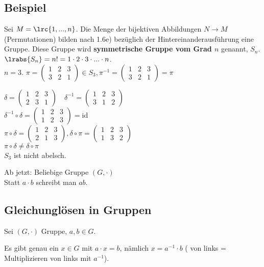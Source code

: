 	\subsection{Beispiel}
	
	Sei $M=\lrc{1,...,n}$. Die Menge der bijektiven Abbildungen $N\rightarrow M$ (Permutationen) bilden nach 1.6e) bezüglich der Hintereinanderausführung eine Gruppe. Diese Gruppe wird \textbf{symmetrische Gruppe vom Grad $n$} genannt, $S_n$.\\
	$\lrabs{S_n}=n!=1\cdot 2\cdot 3\cdot...\cdot n$.\\
	$n=3$. $\pi=\begin{pmatrix}1&2&3\\3&2&1\end{pmatrix}\in S_3,\pi^{-1}=\begin{pmatrix}1&2&3\\3&2&1\end{pmatrix}=\pi$
	
	$\delta=\begin{pmatrix}1&2&3\\2&3&1\end{pmatrix}
	\quad\delta^{-1}=
	\begin{pmatrix}1&2&3\\3&1&2\end{pmatrix}$\\
	$\delta^{-1}\circ\delta=
\begin{pmatrix}1&2&3\\1&2&3\end{pmatrix}=\mbox{id}$\\
	$\pi\circ\delta=\begin{pmatrix}1&2&3\\2&1&3\end{pmatrix},\delta\circ\pi=\begin{pmatrix}1&2&3\\1&3&2\end{pmatrix}$\\
	$\pi\circ\delta\neq\delta\circ\pi$\\
	$S_3$ ist nicht abelsch.
	
	Ab jetzt: Beliebige Gruppe $(G,\cdot)$\\
	Statt $a\cdot b$ schreibt man $ab$.
	
	\subsection{Gleichunglösen in Gruppen}
	
	Sei $(G,\cdot)$ Gruppe, $a,b\in G$.
		\item Es gibt genau ein $x\in G$ mit $a\cdot x=b$, nämlich $x=a^{-1}\cdot b$ ( von links = Multiplizieren von links mit $a^{-1}$).
		
